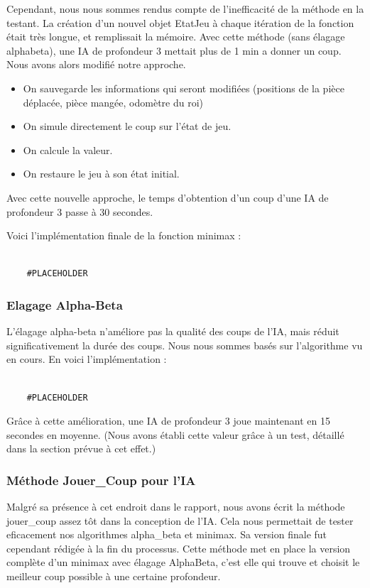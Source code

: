 \documentclass{article}
\begin{document}
Cependant, nous nous sommes rendus compte de l'inefficacité de la méthode en la testant.
La création d'un nouvel objet EtatJeu à chaque itération de la fonction était très longue,
et remplissait la mémoire. Avec cette méthode (sans élagage alpha\-beta), une IA de profondeur 3
mettait plus de 1 min a donner un coup. \\

Nous avons alors modifié notre approche.
\begin{itemize}
    \item On sauvegarde les informations qui seront modifiées (positions de la pièce déplacée, pièce mangée, odomètre du roi)
    \item On simule directement le coup sur l'état de jeu.
    \item On calcule la valeur.
    \item On restaure le jeu à son état initial.
\end{itemize}
Avec cette nouvelle approche, le temps d'obtention d'un coup d'une IA de profondeur 3 passe à 30 secondes.

Voici l'implémentation finale de la fonction minimax :

\begin{verbatim}

    #PLACEHOLDER
\end{verbatim}


\subsubsection{Elagage Alpha-Beta}
L'élagage alpha-beta n'améliore pas la qualité des coups de l'IA, mais réduit significativement la durée des coups.
Nous nous sommes basés sur l'algorithme vu en cours.
En voici l'implémentation :
\begin{verbatim}

    #PLACEHOLDER
\end{verbatim}
Grâce à cette amélioration, une IA de profondeur 3 joue maintenant en 15 secondes en moyenne. (Nous avons établi cette
valeur grâce à un test, détaillé dans la section prévue à cet effet.)
\subsubsection{Méthode Jouer\_Coup pour l'IA}
Malgré sa présence à cet endroit dans le rapport, nous avons écrit la méthode jouer\_coup assez tôt dans la conception de l'IA.
Cela nous permettait de tester eficacement nos algorithmes alpha\_beta et minimax.
Sa version finale fut cependant rédigée à la fin du processus.
Cette méthode met en place la version complète d'un minimax avec élagage Alpha\-Beta, c'est elle qui
trouve et choisit le meilleur coup possible à une certaine profondeur.
\end{document}
